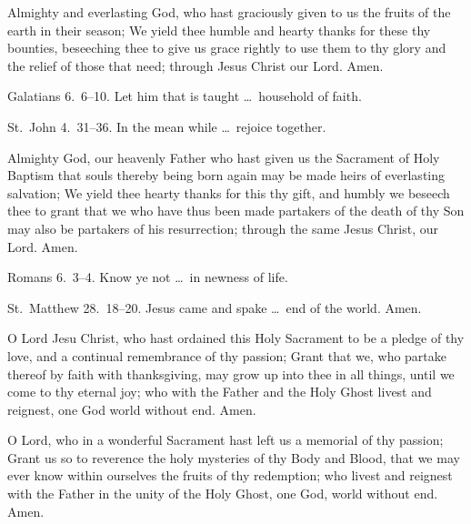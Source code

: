 \medskip



 Almighty and everlasting God, who hast graciously given to us the fruits of the earth in their season; We yield thee humble and hearty thanks for these thy bounties, beseeching thee to give us grace rightly to use them to thy glory and the relief of those that need; through Jesus Christ our Lord. \R Amen.
    
 Galatians 6.~6–10.   Let him that is taught \ldots\ household of faith.

 St.~John 4.~31–36.   In the mean while \ldots\ rejoice together.

\medskip


 Almighty God, our heavenly Father who hast given us the Sacrament of Holy Baptism that souls thereby being born again may be made heirs of everlasting salvation; We yield thee hearty thanks for this thy gift, and humbly we beseech thee to grant that we who have thus been made partakers of the death of thy Son may also be partakers of his resurrection; through the same Jesus Christ, our Lord. \R Amen.

 Romans 6.~3–4.   Know ye not \ldots\ in newness of life.

 St.~Matthew 28.~18–20.   Jesus came and spake \ldots\ end of the world. Amen.


\medskip


 O Lord Jesu Christ, who hast ordained this Holy Sacrament to be a pledge of thy love, and a continual remembrance of thy passion; Grant that we, who partake thereof by faith with thanksgiving, may grow up into thee in all things, until we come to thy eternal joy; who with the Father and the Holy Ghost livest and reignest, one God world without end. \R Amen.

 O Lord, who in a wonderful Sacrament hast left us a memorial of thy passion; Grant us so to reverence the holy mysteries of thy Body and Blood, that we may ever know within ourselves the fruits of thy redemption; who livest and reignest with the Father in the unity of the Holy Ghost, one God, world without end. \R Amen.

